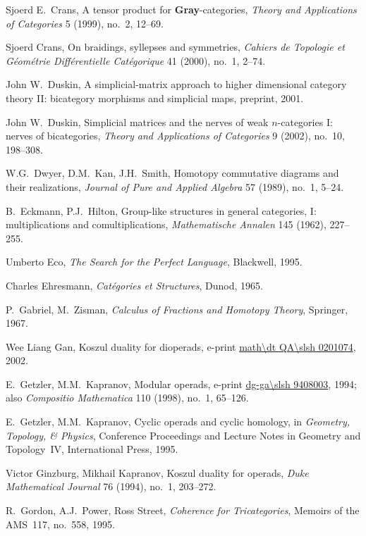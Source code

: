 \begin{thebibliography}{c9999}
Sjoerd E.~Crans,
A tensor product for \textbf{Gray}-categories,
\emph{Theory and Applications of Categories} 5 (1999), no.~2, 12--69.

Sjoerd Crans, 
On braidings, syllepses and symmetries,
\emph{Cahiers de Topologie et G\'eom\'etrie Diff\'erentielle Cat\'egorique} 
41 (2000), no.~1, 2--74.

John W.~Duskin, 
A simplicial-matrix approach to higher dimensional category theory II:
bicategory morphisms and simplicial maps, 
preprint, 2001.

John W.~Duskin, 
Simplicial matrices and the nerves of weak $n$-categories I: nerves of
bicategories, 
\emph{Theory and Applications of Categories} 9 (2002), no.~10, 198--308.

W.G.~Dwyer, D.M.~Kan, J.H.~Smith,
Homotopy commutative diagrams and their realizations,
\emph{Journal of Pure and Applied Algebra} 57 (1989), no.~1, 5--24.

B.~Eckmann, P.J.~Hilton, 
Group-like structures in general categories, I: 
multiplications and comultiplications,
\emph{Mathematische Annalen} 145 (1962), 227--255.

Umberto Eco, 
\emph{The Search for the Perfect Language}, 
Blackwell, 1995.

Charles Ehresmann, 
\emph{Cat\'egories et Structures},
Dunod, 1965.

P.~Gabriel, M.~Zisman,
\emph{Calculus of Fractions and Homotopy Theory},
Springer, 1967.

Wee Liang Gan,
Koszul duality for dioperads,
e-print \url{math\dt QA\slsh 0201074}, 2002.

E.~Getzler, M.M.~Kapranov,
Modular operads,
e-print \url{dg-ga\slsh 9408003}, 1994; 
also
\emph{Compositio Mathematica} 110 (1998), no.~1, 65--126.

E.~Getzler, M.M.~Kapranov,
Cyclic operads and cyclic homology,
in \emph{Geometry, Topology, \& Physics},
Conference Proceedings and Lecture Notes in Geometry and Topology~IV,
International Press, 1995.

Victor Ginzburg, Mikhail Kapranov, 
Koszul duality for operads,
\emph{Duke Mathematical Journal} 76 (1994), no.~1, 203--272.

R.~Gordon, A.J.~Power, Ross Street, 
\emph{Coherence for Tricategories}, 
Memoirs of the AMS~117, no.~558, 1995.


\end{thebibliography}
